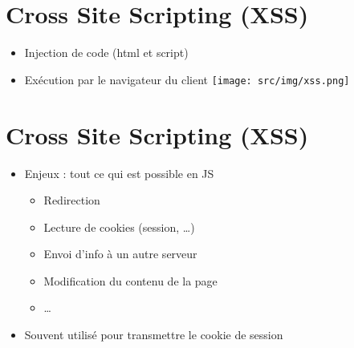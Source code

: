 \hypertarget{cross-site-scripting-xss}{%
\section{Cross Site Scripting (XSS)}\label{cross-site-scripting-xss}}

\begin{itemize}
\tightlist
\item
  Injection de code (html et script)
\item
  Exécution par le navigateur du client
  \texttt{[image: src/img/xss.png]}
\end{itemize}

\hypertarget{cross-site-scripting-xss-1}{%
\section{Cross Site Scripting (XSS)}\label{cross-site-scripting-xss-1}}

\begin{itemize}
\tightlist
\item
  Enjeux : tout ce qui est possible en JS

  \begin{itemize}
  \tightlist
  \item
    Redirection
  \item
    Lecture de cookies (session, \ldots{})
  \item
    Envoi d'info à un autre serveur
  \item
    Modification du contenu de la page
  \item
    \ldots{}
  \end{itemize}
\item
  Souvent utilisé pour transmettre le cookie de session
\end{itemize}

\begin{otherlanguage}{english}

\begin{Shaded}
\begin{Highlighting}[]
\KeywordTok{>}
\end{Highlighting}
\end{Shaded}

\end{otherlanguage}


